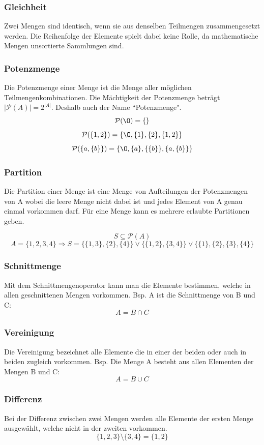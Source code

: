 \documentclass{article}
\begin{document}
\subsubsection{Gleichheit}
Zwei Mengen sind identisch, wenn sie aus denselben Teilmengen zusammengesetzt werden. Die Reihenfolge der Elemente spielt dabei keine Rolle,  da mathematische Mengen unsortierte Sammlungen sind.
\subsubsection{Potenzmenge}
Die Potenzmenge einer Menge ist die Menge aller möglichen Teilmengenkombinationen. Die Mächtigkeit der Potenzmenge beträgt \(|\mathcal{P}(A)| = 2^{|A|}\). Deshalb auch der Name ``Potenzmenge".
\[
		\mathcal{P}(\O) = \{\}
\]
\[
		\mathcal{P}(\{1,2\}) = \{\O, \{1\}, \{2\}, \{1, 2\}\}
\]
\[
\mathcal{P}( \{a, \{b\}\}) = \{\O, \{a\}, \{ \{b\}\}, \{a, \{b\}\}\}
\]
\subsubsection{Partition}
Die Partition einer Menge ist eine Menge von Aufteilungen der Potenzmengen von A wobei die leere Menge nicht dabei ist und jedes Element von A genau einmal vorkommen darf. Für eine Menge kann es mehrere erlaubte Partitionen geben.

\[
S \subseteq \mathcal{P}(A) 
\]
\[
		A = \{1,2,3,4\} \Rightarrow S = \{ \{1,3\}, \{2\}, \{4\}\} \lor \{ \{1,2\}, \{3,4\}\} \lor \{ \{1\}, \{2\}, \{3\}, \{4\}\}
\]

\subsubsection{Schnittmenge}
Mit dem Schnittmengenoperator kann man die Elemente bestimmen, welche in allen geschnittenen Mengen vorkommen.
Bsp. A ist die Schnittmenge von B und C:
\[
A = B \cap C
\]
\subsubsection{Vereinigung}
Die Vereinigung bezeichnet alle Elemente die in einer der beiden oder auch in beiden zugleich vorkommen.
Bsp. Die Menge A besteht aus allen Elementen der Mengen B und C:
\[
A = B \cup C
\]
\subsubsection{Differenz}
Bei der Differenz zwischen zwei Mengen werden alle Elemente der ersten Menge ausgewählt, welche nicht in der zweiten vorkommen.
\[
\{1,2,3\} \setminus \{3,4\} = \{1,2\}
\]
\end{document}
